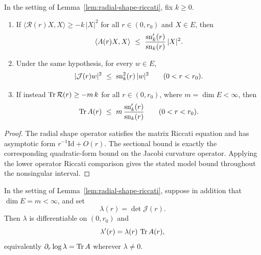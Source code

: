 \begin{lemma}
\label{lem:radial-comparison}





In the setting of Lemma~\ref{lem:radial-shape-riccati}, fix $k\ge0$.
\begin{enumerate}
\item If $\langle{\mathcal R}(r)X,X\rangle\ge-k\,|X|^2$ for all
$r\in(0,r_0)$ and $X\in E$, then
$$\langle A(r)X,X\rangle\ \le\ \frac{\sn_k'(r)}{\sn_k(r)}\,|X|^2 .$$
\item Under the same hypothesis, for every $w\in E$,
$$|{\mathcal J}(r)w|^2\ \le\ \sn_k^2(r)\,|w|^2\qquad(0<r<r_0).$$
\item If instead $\operatorname{Tr}{\mathcal R}(r)\ge-m\,k$ for all $r\in(0,r_0)$,
where $m=\dim E<\infty$, then
$$\Tr A(r)\ \le\ m\,\frac{\sn_k'(r)}{\sn_k(r)}\qquad(0<r<r_0).$$
\end{enumerate}
\end{lemma}

\begin{proof}
\sketch
{}

The radial shape operator satisfies the matrix Riccati equation and has asymptotic form $r^{-1}\mathrm{Id}+O(r)$. The sectional bound is exactly the corresponding quadratic-form bound on the Jacobi curvature operator. Applying the lower operator Riccati comparison gives the stated model bound throughout the nonsingular interval.
\end{proof}

\begin{lemma}
\label{lem:radial-volume-element}





In the setting of Lemma~\ref{lem:radial-shape-riccati}, suppose in addition
that $\dim E=m<\infty$, and set
$$\lambda(r)=\det{\mathcal J}(r).$$
Then $\lambda$ is differentiable on $(0,r_0)$ and
$$\lambda'(r)=\lambda(r)\,\operatorname{Tr} A(r),$$
equivalently $\partial_r\log\lambda=\operatorname{Tr} A$ wherever $\lambda\ne0$.
\end{lemma}

